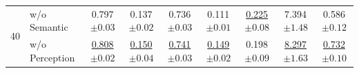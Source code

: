 \documentclass{article}
\begin{document}
\begin{table}[t]
\begin{tabular}{l|l|ccccccc}
        
        
        
        \multirow{2}{*}{40} 
        
        & w/o Semantic  & {0.797\scriptsize{$\pm0.03$}} & {0.137\scriptsize{$\pm0.02$}} & {0.736\scriptsize{$\pm0.03$}} & {0.111\scriptsize{$\pm0.01$}} & \underline{0.225\scriptsize{$\pm0.08$}} & {{7.394\scriptsize{$\pm1.48$}}} & {{0.586\scriptsize{$\pm0.12$}}} \\

        
        & w/o Perception & \underline{{0.808\scriptsize{$\pm0.02$}}} & \underline{0.150\scriptsize{$\pm0.04$}} & \underline{0.741\scriptsize{$\pm0.03$}} & \underline{0.149\scriptsize{$\pm0.02$}} & {0.198\scriptsize{$\pm0.09$}} & \underline{8.297\scriptsize{$\pm1.63$}}
        & \underline{0.732\scriptsize{$\pm0.10$}} \\
        
        \midrule
        
        
        



\end{tabular}
\end{table}
\end{document}
